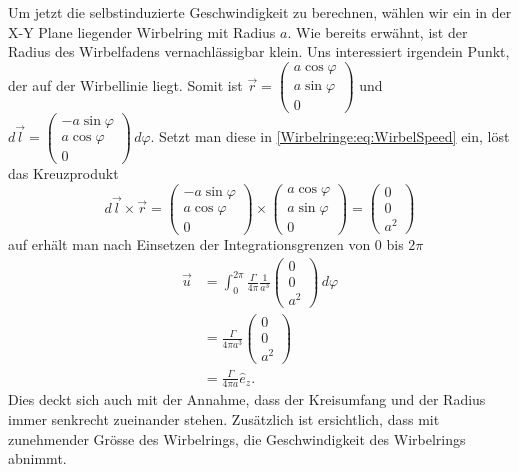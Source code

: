 Um jetzt die selbstinduzierte Geschwindigkeit zu berechnen, wählen wir ein in der X-Y Plane liegender Wirbelring mit Radius \(a\).
Wie bereits erwähnt, ist der Radius des Wirbelfadens vernachlässigbar klein.
Uns interessiert irgendein Punkt, der auf der Wirbellinie liegt.
Somit ist
\(
\vec{r} = 
\begin{pmatrix}
    a \cos \varphi\\
    a \sin \varphi\\
    0    
\end{pmatrix}\)
und
\(
d\vec{l} = 
\begin{pmatrix}
    -a \sin \varphi\\
    a \cos \varphi\\
    0    
\end{pmatrix}
\,d\varphi \). 
Setzt man diese in \eqref{Wirbelringe:eq:WirbelSpeed} ein, löst das Kreuzprodukt 
\[
d\vec{l}\times\vec{r} 
= 
\begin{pmatrix}
    -a \sin \varphi\\
    a \cos \varphi\\
    0
\end{pmatrix}
\times
\begin{pmatrix}
    a \cos \varphi\\
    a \sin \varphi\\
    0    
\end{pmatrix}
=
\begin{pmatrix}
    0\\
    0\\
    a^2
\end{pmatrix}
\]
auf erhält man nach Einsetzen der Integrationsgrenzen von 0 bis \(2\pi\)
\begin{align*}
\vec{u}
&=
\int_{0}^{2\pi} \frac{\Gamma}{4\pi}\frac{1}{a^3}
\begin{pmatrix}
    0\\
    0\\
    a^2
\end{pmatrix}
\,d\varphi\\
&=\frac{\Gamma}{4\pi a^3}
\begin{pmatrix}
    0\\
    0\\
    a^2
\end{pmatrix}\\
&=\frac{\Gamma}{4\pi a}\hat{e}_z.
\end{align*}    
Dies deckt sich auch mit der Annahme, dass der Kreisumfang und der Radius immer senkrecht zueinander stehen.
Zusätzlich ist ersichtlich, dass mit zunehmender Grösse des Wirbelrings, die Geschwindigkeit des Wirbelrings abnimmt.

